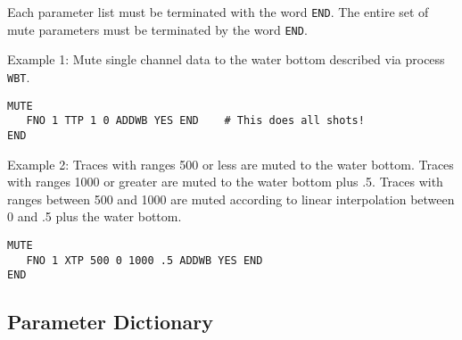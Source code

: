 Each parameter list must be terminated with the word \texttt{END}.  The entire
set of mute parameters must be terminated by the word \texttt{END}.

Example 1: Mute single channel data to the water bottom described via
process \texttt{WBT}.
\begin{verbatim}
MUTE
   FNO 1 TTP 1 0 ADDWB YES END    # This does all shots!
END
\end{verbatim}

Example 2: Traces with ranges 500 or less are muted to the water bottom.
Traces with ranges 1000 or greater are muted to the water bottom plus
.5.  Traces with ranges between 500 and 1000 are muted according to
linear interpolation between 0 and .5 plus the water bottom.
\begin{verbatim}
MUTE
   FNO 1 XTP 500 0 1000 .5 ADDWB YES END
END
\end{verbatim}


\subsection{Parameter Dictionary}

